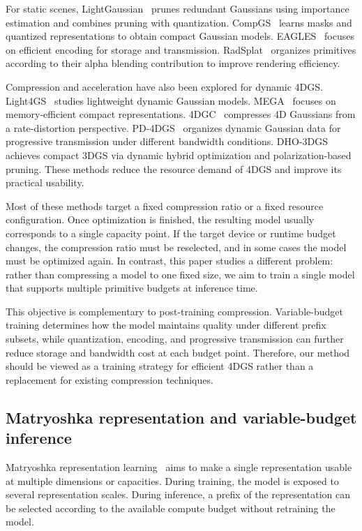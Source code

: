 \documentclass[pdflatex,sn-mathphys]{sn-jnl}
\begin{document}
For static scenes, LightGaussian~\cite{fan2024lightgaussian} prunes redundant Gaussians using importance estimation and combines pruning with quantization. CompGS~\cite{lee2024compact3d} learns masks and quantized representations to obtain compact Gaussian models. EAGLES~\cite{girish2024eagles} focuses on efficient encoding for storage and transmission. RadSplat~\cite{niemeyer2024radsplat} organizes primitives according to their alpha blending contribution to improve rendering efficiency.

Compression and acceleration have also been explored for dynamic 4DGS. Light4GS~\cite{liu2025light4gs} studies lightweight dynamic Gaussian models. MEGA~\cite{zhang2025mega} focuses on memory-efficient compact representations. 4DGC~\cite{hu20254dgc} compresses 4D Gaussians from a rate-distortion perspective. PD-4DGS~\cite{li2025pd4dgs} organizes dynamic Gaussian data for progressive transmission under different bandwidth conditions. DHO-3DGS~\cite{zhang2026dho3dgs} achieves compact 3DGS via dynamic hybrid optimization and polarization-based pruning. These methods reduce the resource demand of 4DGS and improve its practical usability.

Most of these methods target a fixed compression ratio or a fixed resource configuration. Once optimization is finished, the resulting model usually corresponds to a single capacity point. If the target device or runtime budget changes, the compression ratio must be reselected, and in some cases the model must be optimized again. In contrast, this paper studies a different problem: rather than compressing a model to one fixed size, we aim to train a single model that supports multiple primitive budgets at inference time.

This objective is complementary to post-training compression. Variable-budget training determines how the model maintains quality under different prefix subsets, while quantization, encoding, and progressive transmission can further reduce storage and bandwidth cost at each budget point. Therefore, our method should be viewed as a training strategy for efficient 4DGS rather than a replacement for existing compression techniques.

\subsection{Matryoshka representation and variable-budget inference}

Matryoshka representation learning~\cite{kusupati2022matryoshka} aims to make a single representation usable at multiple dimensions or capacities. During training, the model is exposed to several representation scales. During inference, a prefix of the representation can be selected according to the available compute budget without retraining the model.
\end{document}
